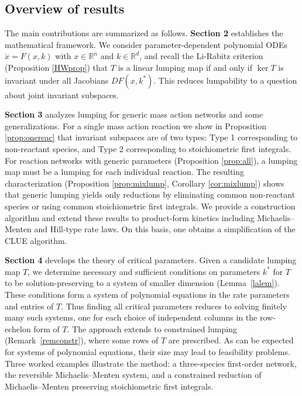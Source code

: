 \documentclass{article}
\begin{document}
\subsection{Overview of results}

The main contributions are summarized as follows. \textbf{Section 2} establishes the mathematical framework. We consider parameter-dependent polynomial ODEs $\dot{x} = F(x,k)$ with $x \in \mathbb{R}^n$ and $k \in \mathbb{R}^d$, and recall the Li-Rabitz criterion (Proposition \ref{HWprop}) that $T$ is a linear lumping map if and only if $\ker T$ is invariant under all Jacobians $DF(x,k^*)$. This reduces lumpability to a question about joint invariant subspaces.

\textbf{Section 3} analyzes lumping for generic mass action networks and some generalizations. For a single mass action reaction we show in Proposition \ref{prop:onereac} that invariant subspaces are of two types: Type 1 corresponding to non-reactant species, and Type 2 corresponding to stoichiometric first integrals. For reaction networks with generic parameters (Proposition \ref{prop:all}), a lumping map must be a lumping for each individual reaction. The resulting characterization (Proposition \ref{prop:mixlump}, Corollary \ref{cor:mixlump}) shows that generic lumping yields only reductions by eliminating common non-reactant species or using common stoichiometric first integrals. We provide a construction algorithm and extend these results to product-form kinetics including Michaelis--Menten and Hill-type rate laws. On this basis, one obtains a simplification of the CLUE algorithm.

\textbf{Section 4} develops the theory of critical parameters. Given a candidate lumping map $T$, we determine necessary and sufficient conditions on parameters $k^*$ for $T$ to be solution-preserving to a system of smaller dimension (Lemma~\ref{lalem}). These conditions form a system of polynomial equations in the rate parameters and entries of $T$. Thus finding all critical parameters reduces to solving finitely many such systems, one for each choice of independent columns in the row-echelon form of $T$. The approach extends to constrained lumping (Remark~\ref{remconstr}), where some rows of $T$ are prescribed. As can be expected for systems of polynomial equations, their size may lead to feasibility problems. Three worked examples illustrate the method: a three-species first-order network, the reversible Michaelis--Menten system, and a constrained reduction of Michaelis--Menten preserving stoichiometric first integrals. 
\end{document}

